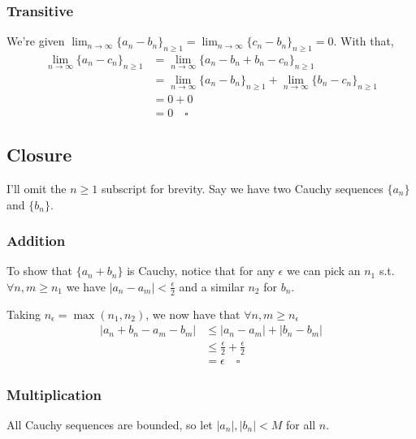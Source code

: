 \documentclass[12pt]{article}
\begin{document}
\subsubsection{Transitive}

We're given $\lim_{n \to \infty} \{a_n-b_n\}_{n \ge 1}=\lim_{n \to \infty} \{c_n-b_n\}_{n \ge 1}=0$.
With that,
\begin{align*}
  \lim_{n \to \infty} \{a_n-c_n\}_{n \ge 1}
   & = \lim_{n \to \infty} \{a_n-b_n+b_n-c_n\}_{n \ge 1}                                     \\
   & = \lim_{n \to \infty} \{a_n-b_n\}_{n \ge 1} + \lim_{n \to \infty} \{b_n-c_n\}_{n \ge 1} \\
   & = 0 + 0                                                                                 \\
   & = 0 \quad\square
\end{align*}

\subsection{Closure}

I'll omit the $n \ge 1$ subscript for brevity.
Say we have two Cauchy sequences $\{a_n\}$ and $\{b_n\}$.

\subsubsection{Addition}

To show that $\{a_n+b_n\}$ is Cauchy, notice that for any $\epsilon$
we can pick an $n_1$ s.t. $\forall n, m \ge n_1$ we have $|a_n-a_m| < \frac{\epsilon}{2}$
and a similar $n_2$ for $b_n$.

Taking $n_\epsilon = \max(n_1, n_2)$,
we now have that $\forall n, m \ge n_\epsilon$
\begin{align*}
  |a_n+b_n - a_m-b_m|
   & \le |a_n-a_m| + |b_n-b_m|                   \\
   & \le \frac{\epsilon}{2} + \frac{\epsilon}{2} \\
   & = \epsilon\quad\square
\end{align*}

\subsubsection{Multiplication}

All Cauchy sequences are bounded, so let $|a_n|, |b_n| < M$ for all $n$.
\end{document}
